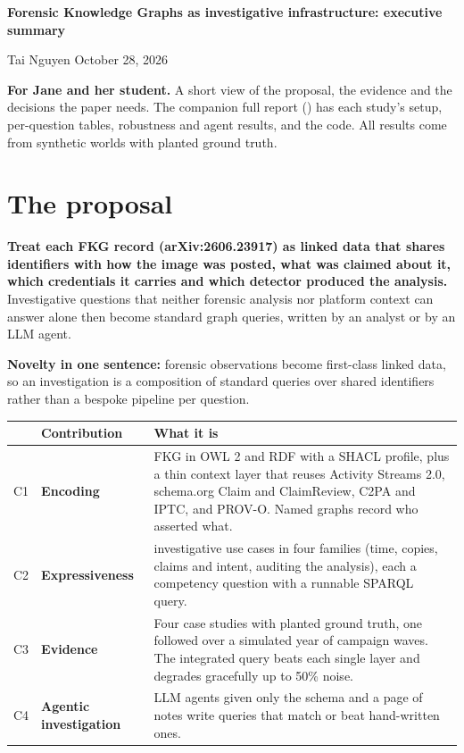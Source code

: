 \documentclass[11pt]{article}
\begin{document}
\begin{center}
{\LARGE\bfseries Forensic Knowledge Graphs as investigative infrastructure: executive summary\par}
\vspace{6pt}
{\normalsize Tai Nguyen \quad\textperiodcentered\quad October 28, 2026\par}
\end{center}
\vspace{4pt}

\begin{notebox}
\textbf{For Jane and her student.} A short view of the proposal, the evidence and the decisions the paper needs. The companion full report () has each study's setup, per-question tables, robustness and agent results, and the code. All results come from synthetic worlds with planted ground truth.
\end{notebox}

\section*{The proposal}
\textbf{Treat each FKG record (arXiv:2606.23917) as linked data that shares identifiers with how the image was posted, what was claimed about it, which credentials it carries and which detector produced the analysis.} Investigative questions that neither forensic analysis nor platform context can answer alone then become standard graph queries, written by an analyst or by an LLM agent.

\textbf{Novelty in one sentence:} forensic observations become first-class linked data, so an investigation is a composition of standard queries over shared identifiers rather than a bespoke pipeline per question.

\begingroup\small\par\smallskip\noindent
\begin{tabularx}{\linewidth}{@{}l>{\raggedright\arraybackslash}p{2.6cm}>{\raggedright\arraybackslash}X@{}}
\toprule
 & \textbf{Contribution} & \textbf{What it is} \\
\midrule
C1 & \textbf{Encoding} & FKG in OWL 2 and RDF with a SHACL profile, plus a thin context layer that reuses Activity Streams 2.0, schema.org Claim and ClaimReview, C2PA and IPTC, and PROV-O. Named graphs record who asserted what. \\
C2 & \textbf{Expressiveness} & 18 investigative use cases in four families (time, copies, claims and intent, auditing the analysis), each a competency question with a runnable SPARQL query. \\
C3 & \textbf{Evidence} & Four case studies with planted ground truth, one followed over a simulated year of campaign waves. The integrated query beats each single layer and degrades gracefully up to 50\% noise. \\
C4 & \textbf{Agentic investigation} & LLM agents given only the schema and a page of notes write queries that match or beat hand-written ones. \\
\bottomrule
\end{tabularx}
\par\medskip\endgroup
\end{document}
